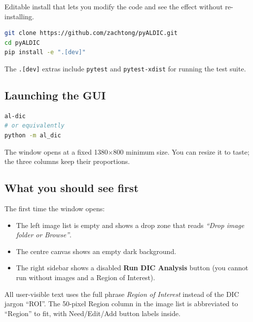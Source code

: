Editable install that lets you modify the code and see the effect
without re-installing.

\begin{lstlisting}[language=bash]
git clone https://github.com/zachtong/pyALDIC.git
cd pyALDIC
pip install -e ".[dev]"
\end{lstlisting}

The \texttt{.[dev]} extras include \texttt{pytest} and
\texttt{pytest-xdist} for running the test suite.

\subsection{Launching the GUI}

\begin{lstlisting}[language=bash]
al-dic
# or equivalently
python -m al_dic
\end{lstlisting}

The window opens at a fixed 1380$\times$800 minimum size. You can
resize it to taste; the three columns keep their proportions.

\subsection{What you should see first}

The first time the window opens:
\begin{itemize}
  \item The left image list is empty and shows a drop zone that reads
    \emph{``Drop image folder or Browse''}.
  \item The centre canvas shows an empty dark background.
  \item The right sidebar shows a disabled \textbf{Run DIC Analysis}
    button (you cannot run without images and a Region of Interest).
\end{itemize}

\begin{tipbox}
All user-visible text uses the full phrase \emph{Region of Interest}
instead of the DIC jargon ``ROI''. The 50-pixel Region column in the
image list is abbreviated to ``Region'' to fit, with
Need/Edit/Add button labels inside.
\end{tipbox}
